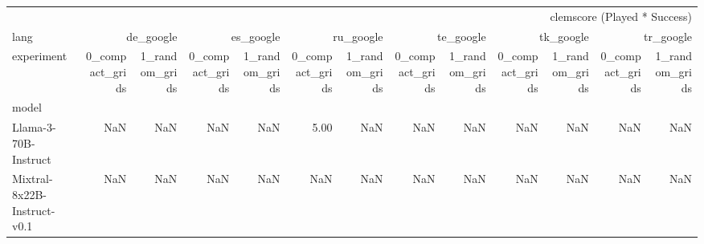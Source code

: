 \begin{tabular}{lrrrrrrrrrrrr}
\toprule
 & \multicolumn{12}{r}{clemscore (Played * Success)} \\
lang & \multicolumn{2}{r}{de_google} & \multicolumn{2}{r}{es_google} & \multicolumn{2}{r}{ru_google} & \multicolumn{2}{r}{te_google} & \multicolumn{2}{r}{tk_google} & \multicolumn{2}{r}{tr_google} \\
experiment & 0_compact_grids & 1_random_grids & 0_compact_grids & 1_random_grids & 0_compact_grids & 1_random_grids & 0_compact_grids & 1_random_grids & 0_compact_grids & 1_random_grids & 0_compact_grids & 1_random_grids \\
model &  &  &  &  &  &  &  &  &  &  &  &  \\
\midrule
Llama-3-70B-Instruct & NaN & NaN & NaN & NaN & 5.00 & NaN & NaN & NaN & NaN & NaN & NaN & NaN \\
Mixtral-8x22B-Instruct-v0.1 & NaN & NaN & NaN & NaN & NaN & NaN & NaN & NaN & NaN & NaN & NaN & NaN \\
\bottomrule
\end{tabular}
